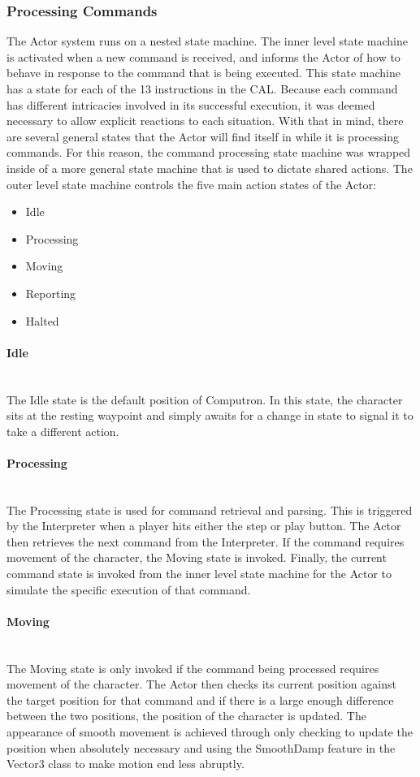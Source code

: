 \subsubsection{Processing Commands}
The Actor system runs on a nested state machine. The inner level state machine is activated when a new command is received, and informs the Actor of how to behave in response to the command that is being executed. This state machine has a state for each of the 13 instructions in the CAL. Because each command has different intricacies involved in its successful execution, it was deemed necessary to allow explicit reactions to each situation. With that in mind, there are several general states that the Actor will find itself in while it is processing commands. For this reason, the command processing state machine was wrapped inside of a more general state machine that is used to dictate shared actions. The outer level state machine controls the five main action states of the Actor:
\begin{itemize}
	\item Idle
	\item Processing
	\item Moving
	\item Reporting
	\item Halted
\end{itemize}

\paragraph{Idle}~\\
The Idle state is the default position of Computron. In this state, the character sits at the resting waypoint and simply awaits for a change in state to signal it to take a different action.

\paragraph{Processing}~\\
The Processing state is used for command retrieval and parsing. This is triggered by the Interpreter when a player hits either the step or play button. The Actor then retrieves the next command from the Interpreter. If the command requires movement of the character, the Moving state is invoked. Finally, the current command state is invoked from the inner level state machine for the Actor to simulate the specific execution of that command.

\paragraph{Moving}~\\
The Moving state is only invoked if the command being processed requires movement of the character. The Actor then checks its current position against the target position for that command and if there is a large enough difference between the two positions, the position of the character is updated. The appearance of smooth movement is achieved through only checking to update the position when absolutely necessary and using the SmoothDamp feature in the Vector3 class to make motion end less abruptly.

